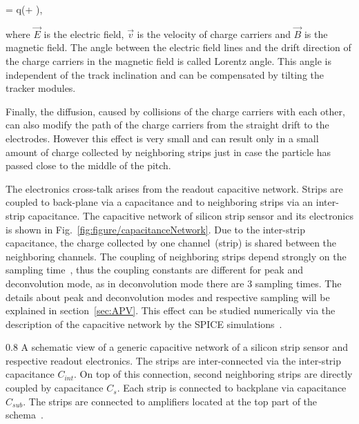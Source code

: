 {
   =  q(+ \times {}),
}

where $\vec{E}$ is the electric field, $\vec{v}$ is the velocity of charge carriers and $\vec{B}$ is the magnetic field. The angle between the electric field lines and the drift direction of the charge carriers in the magnetic field is called Lorentz angle. This angle is independent of the track inclination and can be compensated by tilting the tracker modules.

Finally, the diffusion, caused by collisions of the charge carriers with each other, can also modify the path of the charge carriers from the straight drift to the electrodes. However this effect is very small and can result only in a small amount of charge collected by neighboring strips just in case the particle has passed close to the middle of the pitch.


The electronics cross-talk arises from the readout capacitive network. Strips are coupled to back-plane via a capacitance and to neighboring strips via an inter-strip capacitance. The capacitive network of silicon strip sensor and its electronics is shown in Fig.~\ref{fig:figure/capacitanceNetwork}. Due to the inter-strip capacitance, the charge collected by one channel~(strip) is shared between the neighboring channels. The coupling of neighboring strips depend strongly on the sampling time~\cite{Bloch:2007zza}, thus the coupling constants are different for peak and deconvolution mode, as in deconvolution mode there are 3 sampling times. The details about peak and deconvolution modes and respective sampling will be explained in section~\ref{sec:APV}. This effect can be studied numerically via the description of the capacitive network by the SPICE simulations~\cite{Barberis:1993ph}.


                 {0.8}       %
                 {A schematic view of a generic capacitive network of a silicon strip sensor and respective readout electronics. The strips are inter-connected via the inter-strip capacitance $C_{int}$. On top of this connection, second neighboring strips are directly coupled by capacitance $C_{s}$. Each strip is connected to backplane via capacitance $C_{sub}$. The strips are connected to amplifiers located at the top part of the schema~\cite{Lutz:1987wd}.}




